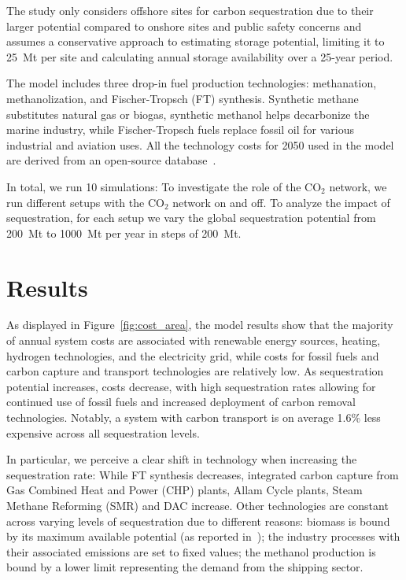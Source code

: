 \documentclass[twocolumn]{article}
\newcommand{\carbon}{CO$_2$}
\begin{document}

The study only considers offshore sites for carbon sequestration due to their larger potential compared to onshore sites and public safety concerns and assumes a conservative approach to estimating storage potential, limiting it to 25~Mt per site and calculating annual storage availability over a 25-year period.

The model includes three drop-in fuel production technologies: methanation, methanolization, and Fischer-Tropsch (FT) synthesis. Synthetic methane substitutes natural gas or biogas, synthetic methanol helps decarbonize the marine industry, while Fischer-Tropsch fuels replace fossil oil for various industrial and aviation uses. All the technology costs for 2050 used in the model are derived from an open-source database~\cite{lisazeyenPyPSATechnologydataTechnology2023}.

In total, we run 10 simulations: To investigate the role of the \carbon{} network, we run different setups with the \carbon{} network on and off. To analyze the impact of sequestration, for each setup we vary the global sequestration potential from 200~Mt to 1000~Mt per year in steps of 200~Mt.

\section{Results}

As displayed in Figure~\ref{fig:cost_area}, the model results show that the majority of annual system costs are associated with renewable energy sources, heating, hydrogen technologies, and the electricity grid, while costs for fossil fuels and carbon capture and transport technologies are relatively low. As sequestration potential increases, costs decrease, with high sequestration rates allowing for continued use of fossil fuels and increased deployment of carbon removal technologies. Notably, a system with carbon transport is on average 1.6\% less expensive across all sequestration levels.


In particular, we perceive a clear shift in technology when increasing the sequestration rate: While FT synthesis decreases, integrated carbon capture from Gas Combined Heat and Power (CHP) plants, Allam Cycle plants, Steam Methane Reforming (SMR) and DAC increase. Other technologies are constant across varying levels of sequestration due to different reasons: biomass is bound by its maximum available potential (as reported in~\cite{europeancommissionjointresearchcentreENSPRESOBIOMASS2019}); the industry processes with their associated emissions are set to fixed values; the methanol production is bound by a lower limit representing the demand from the shipping sector.
\end{document}
